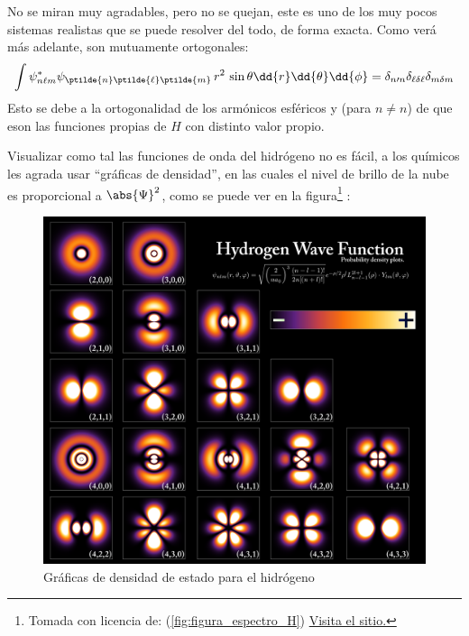 No se miran muy agradables, pero no se quejan, este es uno de los muy pocos sistemas realistas que se puede resolver del todo, de forma exacta. Como verá más adelante, son mutuamente ortogonales:
\begin{align}
\int \psi_{n \ell m}^{*} \psi_{\ptilde{n} \ptilde{\ell} \ptilde{m}} \, r^{2} \, \sin \theta \dd{r} \dd{\theta} \dd{\phi} =  \delta_{n \prime{n}} \delta_{\ell \delta{\ell}} \delta_{m \delta{m}}
\label{eq:ecuacion_04_90}
\end{align}
Esto se debe a la ortogonalidad de los armónicos esféricos y (para $n \neq n$) de que eson las funciones propias de $H$ con distinto valor propio.
\par
Visualizar como tal las funciones de onda del hidrógeno no es fácil, a los químicos les agrada usar \enquote{gráficas de densidad}, en las cuales el nivel de brillo de la nube es proporcional a $\abs{\Psi}^{2}$, como se puede ver en la figura\footnote{Tomada con licencia de:  (\ref{fig:figura_espectro_H}) \href{https://commons.wikimedia.org/wiki/File:Hydrogen_Density_Plots.png}{Visita el sitio.}} :
\begin{figure}[H]
    \centering
    \includegraphics[scale=0.15]{Imagenes/Hydrogen_Density_Plots.png}
    \caption{Gráficas de densidad de estado para el hidrógeno}
\end{figure}



